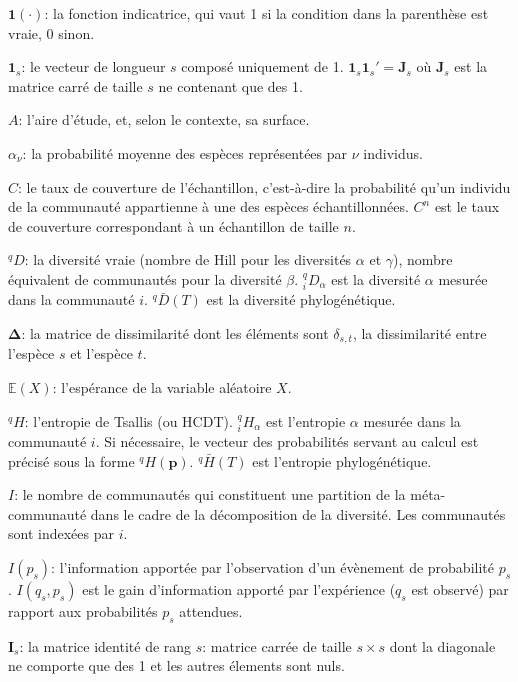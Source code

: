 \documentclass[
  11pt,
  french,
  a4paper,
  extrafontsizes,onecolumn,openright
  ]{memoir}
\newlength{\rf}
\begin{document}
\noindent \({\mathbf 1}(\cdot)\): la fonction indicatrice, qui vaut 1 si la condition dans la parenthèse est vraie, 0 sinon.

\noindent \(\mathbf{1}_s\): le vecteur de longueur \(s\) composé uniquement de 1. \(\mathbf{1}_s\mathbf{1}_s'=\mathbf{J}_s\) où \(\mathbf{J}_s\) est la matrice carré de taille \(s\) ne contenant que des 1.

\noindent \(A\): l'aire d'étude, et, selon le contexte, sa surface.

\noindent \(\alpha_\nu\): la probabilité moyenne des espèces représentées par \(\nu\) individus.

\noindent \(C\): le taux de couverture de l'échantillon, c'est-à-dire la probabilité qu'un individu de la communauté appartienne à une des espèces échantillonnées.
\(C^{n}\) est le taux de couverture correspondant à un échantillon de taille \(n\).

\noindent \(^{q}\!D\): la diversité vraie (nombre de Hill pour les diversités \(\alpha\) et \(\gamma\)), nombre équivalent de communautés pour la diversité \(\beta\).
\(^{q}_{i}\!D_{\alpha}\) est la diversité \(\alpha\) mesurée dans la communauté \(i\).
\(^{q}\!\bar{D}\left(T\right)\) est la diversité phylogénétique.

\noindent \(\boldsymbol{\Delta}\): la matrice de dissimilarité dont les éléments sont \(\delta_{s,t}\), la dissimilarité entre l'espèce \(s\) et l'espèce \(t\).

\noindent \({\mathbb E}\left(X\right)\): l'espérance de la variable aléatoire \(X\).

\noindent \(^{q}\!H\): l'entropie de Tsallis (ou HCDT).
\(^{q}_{i}\!H_{\alpha}\) est l'entropie \(\alpha\) mesurée dans la communauté \(i\).
Si nécessaire, le vecteur des probabilités servant au calcul est précisé sous la forme \(^{q}\!H(\mathbf{p})\).
\(^{q}\!\bar{H}(T)\) est l'entropie phylogénétique.

\noindent \(I\): le nombre de communautés qui constituent une partition de la méta-communauté dans le cadre de la décomposition de la diversité.
Les communautés sont indexées par \(i\).

\noindent \(I(p_s)\): l'information apportée par l'observation d'un évènement de probabilité \(p_s\).
\(I(q_s,p_s)\) est le gain d'information apporté par l'expérience (\(q_s\) est observé) par rapport aux probabilités \(p_s\) attendues.

\noindent \(\mathbf{I}_s\): la matrice identité de rang \(s\): matrice carrée de taille \(s\times s\) dont la diagonale ne comporte que des 1 et les autres élements sont nuls.
\end{document}
